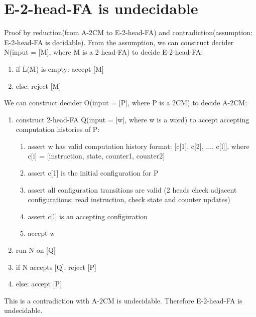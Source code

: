\documentclass{article}
\begin{document}
\section{E-2-head-FA is undecidable}
Proof by reduction(from A-2CM to E-2-head-FA) and contradiction(assumption: E-2-head-FA is decidable). From the assumption, we can construct decider N(input = [M], where M is a 2-head-FA) to decide E-2-head-FA:
\begin{enumerate}
	\item if L(M) is empty: accept [M]
	\item else: reject [M]
\end{enumerate}
We can construct decider O(input = [P], where P is a 2CM) to decide A-2CM:
\begin{enumerate}
	\item construct 2-head-FA Q(input = [w], where w is a word) to accept accepting computation histories of P:
	\begin{enumerate}
		\item assert w has valid computation history format: [c[1], c[2], ..., c[l]], where c[i] = [instruction, state, counter1, counter2]
		\item assert c[1] is the initial configuration for P
		\item assert all configuration transitions are valid (2 heads check adjacent configurations: read instruction, check state and counter updates)
		\item assert c[l] is an accepting configuration
		\item accept w
	\end{enumerate}
	\item run N on [Q]
	\item if N accepts [Q]: reject [P]
	\item else: accept [P]
\end{enumerate}
This is a contradiction with A-2CM is undecidable. Therefore E-2-head-FA is undecidable.
\end{document}
